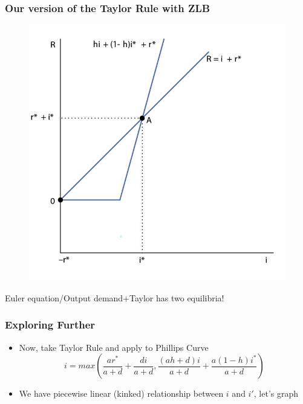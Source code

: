 \documentclass{beamer}
\begin{document}
\begin{frame}
\frametitle[alignment=center]{Our version of the Taylor Rule with ZLB}
\begin{figure}
\centering
\includegraphics[scale=0.5]{Figures/W_Fig_15pt11.png}
\end{figure}
Euler equation/Output demand+Taylor has two equilibria!
\end{frame}

\begin{frame}
\frametitle[alignment=center]{Exploring Further}
\begin{itemize}
\item Now, take Taylor Rule and apply to Phillips Curve
$$i=max\left(\frac{ar^*}{a+d}+\frac{di}{a+d},\frac{(ah+d)i}{a+d}+\frac{a(1-h)i^*}{a+d}\right)$$
\item We have piecewise linear (kinked) relationship between $i$ and $i'$, let's graph
\end{itemize}
\end{frame}
\end{document}
